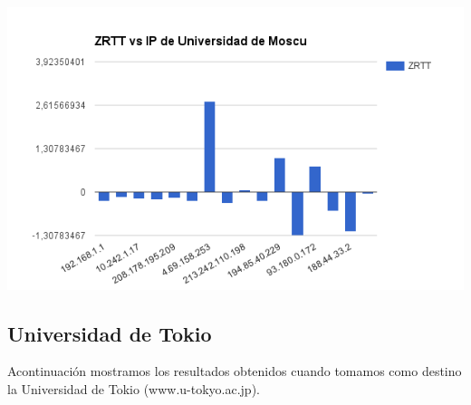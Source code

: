 \begin{center}
\includegraphics[width=\textwidth]{imgs/moscu.png}
\end{center}


\subsection{Universidad de Tokio}
Acontinuación mostramos los resultados obtenidos cuando tomamos como destino la
Universidad de Tokio (www.u-tokyo.ac.jp).

